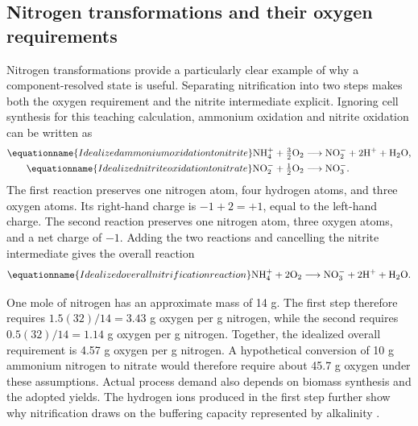 \subsection{Nitrogen transformations and their oxygen requirements}

Nitrogen transformations provide a particularly clear example of why a component-resolved state is useful. Separating nitrification into two steps makes both the oxygen requirement and the nitrite intermediate explicit. Ignoring cell synthesis for this teaching calculation, ammonium oxidation and nitrite oxidation can be written as
\begin{align}
\equationname{Idealized ammonium oxidation to nitrite}
\mathrm{NH_4^+}+\tfrac32\mathrm{O_2}
&\longrightarrow\mathrm{NO_2^-}+2\mathrm{H^+}+\mathrm{H_2O},
\label{eq:teaching_ammonium_oxidation}\\
\equationname{Idealized nitrite oxidation to nitrate}
\mathrm{NO_2^-}+\tfrac12\mathrm{O_2}
&\longrightarrow\mathrm{NO_3^-}.
\label{eq:teaching_nitrite_oxidation}
\end{align}
The first reaction preserves one nitrogen atom, four hydrogen atoms, and three oxygen atoms. Its right-hand charge is $-1+2=+1$, equal to the left-hand charge. The second reaction preserves one nitrogen atom, three oxygen atoms, and a net charge of $-1$. Adding the two reactions and cancelling the nitrite intermediate gives the overall reaction
\begin{equation}
\equationname{Idealized overall nitrification reaction}
\mathrm{NH_4^+}+2\mathrm{O_2}
\longrightarrow\mathrm{NO_3^-}+2\mathrm{H^+}+\mathrm{H_2O}.
\label{eq:teaching_overall_nitrification}
\end{equation}

One mole of nitrogen has an approximate mass of 14 g. The first step therefore requires $1.5(32)/14=3.43$ g oxygen per g nitrogen, while the second requires $0.5(32)/14=1.14$ g oxygen per g nitrogen. Together, the idealized overall requirement is 4.57 g oxygen per g nitrogen. A hypothetical conversion of 10 g ammonium nitrogen to nitrate would therefore require about 45.7 g oxygen under these assumptions. Actual process demand also depends on biomass synthesis and the adopted yields. The hydrogen ions produced in the first step further show why nitrification draws on the buffering capacity represented by alkalinity \citep{Guerrero2011,Henze2006}.

